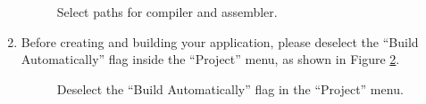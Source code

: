 \begin{enumerate}
\begin{figure}[htb]
\caption{Select paths for compiler and assembler.}
\label{fig:preferences-pic30}
\end{figure}


\item
  Before creating and building your application, please deselect the
  ``Build Automatically'' flag inside the ``Project'' menu, as shown
  in Figure \ref{fig:build-automatically}.
%
\begin{figure}[htb]
\caption{Deselect the ``Build Automatically'' flag in the ``Project'' menu.}
\label{fig:build-automatically}
\end{figure}



\end{enumerate}

